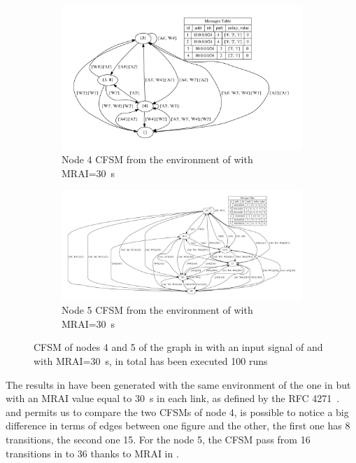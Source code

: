 \begin{figure}[h]
     \centering
     \begin{subfigure}[b]{0.7\textwidth}
         \centering
         \includegraphics[width=\textwidth]{images/fsm/fig_4_4_MRAI30.pdf}
		 \caption{Node \num{4} \ac{CFSM} from the environment of  with \ac{MRAI}=\SI{30}{\second}}
         \label{fig:fsm_node4_MRAI}
     \end{subfigure}
     \hfill
     \begin{subfigure}[b]{0.9\textwidth}
         \centering
         \includegraphics[width=\textwidth]{images/fsm/fig_4_5_MRAI30.pdf}
		 \caption{Node \num{5} \ac{CFSM} from the environment of  with \ac{MRAI}=\SI{30}{\second}}
         \label{fig:fsm_node5_MRAI}
     \end{subfigure}
		\caption{\ac{CFSM} of nodes \num{4} and \num{5} of the graph in
			 with an input signal of  and with
			\ac{MRAI}=\SI{30}{\second}, in total has been executed \num{100} runs}
        \label{fig:fsm_griffin_fig4_MRAI}
\end{figure}

The results in  have been generated with the same
environment of the one in  but with an \ac{MRAI} value
equal to \SI{30}{\second} in each link, as defined by the \ac{RFC} \num{4271}~\cite{rfc4271}.
 and  permits us to compare the two
\ac{CFSM}s of node \num{4}, is possible to notice a big difference in terms of edges
between one figure and the other, the first one has \num{8} transitions, the
second one \num{15}.
For the node \num{5}, the \ac{CFSM} pass from \num{16} transitions in 
to \num{36} thanks to \ac{MRAI} in .


